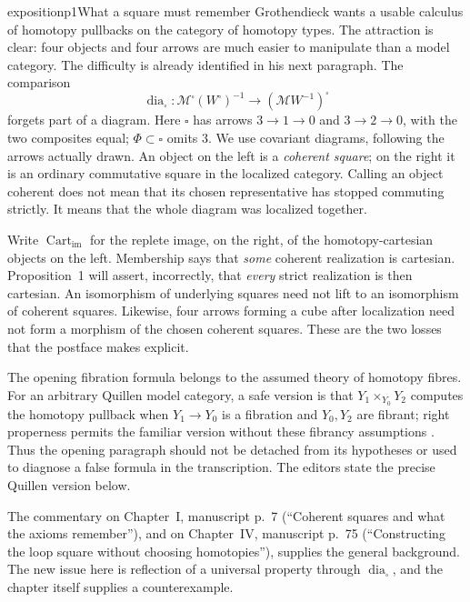 
\begin{dcomment}{exposition}{p1}{What a square must remember}
Grothendieck wants a usable calculus of homotopy pullbacks on the category of homotopy types. The attraction is clear: four objects and four arrows are much easier to manipulate than a model category. The difficulty is already identified in his next paragraph. The comparison
\[
 \operatorname{dia}_{\square}:
 \mathcal M^{\square}(W^{\square})^{-1}
 \longrightarrow (\mathcal MW^{-1})^{\square}
\]
forgets part of a diagram. Here $\square$ has arrows $3\to1\to0$ and $3\to2\to0$, with the two composites equal; $\Phi\subset\square$ omits $3$. We use covariant diagrams, following the arrows actually drawn. An object on the left is a \emph{coherent square}; on the right it is an ordinary commutative square in the localized category. Calling an object coherent does not mean that its chosen representative has stopped commuting strictly. It means that the whole diagram was localized together.

Write $\operatorname{Cart}_{\mathrm{im}}$ for the replete image, on the right, of the homotopy-cartesian objects on the left. Membership says that \emph{some} coherent realization is cartesian. Proposition~1 will assert, incorrectly, that \emph{every} strict realization is then cartesian. An isomorphism of underlying squares need not lift to an isomorphism of coherent squares. Likewise, four arrows forming a cube after localization need not form a morphism of the chosen coherent squares. These are the two losses that the postface makes explicit.

The opening fibration formula belongs to the assumed theory of homotopy fibres. For an arbitrary Quillen model category, a safe version is that $Y_1\times_{Y_0}Y_2$ computes the homotopy pullback when $Y_1\to Y_0$ is a fibration and $Y_0,Y_2$ are fibrant; right properness permits the familiar version without these fibrancy assumptions \citep[Theorem~5.2.5 and the mixed Reedy argument of Lemma~5.2.6, dualized]{Hovey1999ModelCategories}. Thus the opening paragraph should not be detached from its hypotheses or used to diagnose a false formula in the transcription. The editors state the precise Quillen version below.

The commentary on Chapter~I, manuscript p.~7 (``Coherent squares and what the axioms remember''), and on Chapter~IV, manuscript p.~75 (``Constructing the loop square without choosing homotopies''), supplies the general background. The new issue here is reflection of a universal property through $\operatorname{dia}_{\square}$, and the chapter itself supplies a counterexample.
\end{dcomment}

